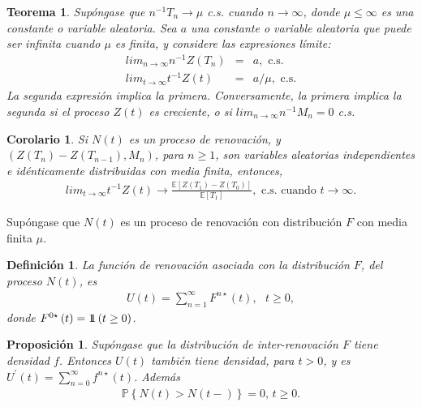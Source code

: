 \documentclass{article}
\newtheorem{Def}{Definición}
\newtheorem{Teo}{Teorema}
\newtheorem{Prop}{Proposición}
\newtheorem{Coro}{Corolario}
\newcommand{\esp}{\mathbb{E}}
\newcommand{\prob}{\mathbb{P}}
\newcommand{\indora}{\mbox{$1$\hspace{-0.8ex}$1$}}
\begin{document}
\begin{Teo}
Sup\'ongase que $n^{-1}T_{n}\rightarrow\mu$ c.s. cuando $n\rightarrow\infty$, donde $\mu\leq\infty$ es una constante o variable aleatoria. Sea $a$ una constante o variable aleatoria que puede ser infinita cuando $\mu$ es finita, y considere las expresiones l\'imite:
\begin{eqnarray}
lim_{n\rightarrow\infty}n^{-1}Z\left(T_{n}\right)&=&a,\textrm{ c.s.}\\
lim_{t\rightarrow\infty}t^{-1}Z\left(t\right)&=&a/\mu,\textrm{ c.s.}
\end{eqnarray}
La segunda expresi\'on implica la primera. Conversamente, la primera implica la segunda si el proceso $Z\left(t\right)$ es creciente, o si $lim_{n\rightarrow\infty}n^{-1}M_{n}=0$ c.s.
\end{Teo}

\begin{Coro}
Si $N\left(t\right)$ es un proceso de renovaci\'on, y $\left(Z\left(T_{n}\right)-Z\left(T_{n-1}\right),M_{n}\right)$, para $n\geq1$, son variables aleatorias independientes e id\'enticamente distribuidas con media finita, entonces,
\begin{eqnarray}
lim_{t\rightarrow\infty}t^{-1}Z\left(t\right)\rightarrow\frac{\esp\left[Z\left(T_{1}\right)-Z\left(T_{0}\right)\right]}{\esp\left[T_{1}\right]},\textrm{ c.s. cuando  }t\rightarrow\infty.
\end{eqnarray}
\end{Coro}


Sup\'ongase que $N\left(t\right)$ es un proceso de renovaci\'on con distribuci\'on $F$ con media finita $\mu$.

\begin{Def}
La funci\'on de renovaci\'on asociada con la distribuci\'on $F$, del proceso $N\left(t\right)$, es
\begin{eqnarray*}
U\left(t\right)=\sum_{n=1}^{\infty}F^{n\star}\left(t\right),\textrm{   }t\geq0,
\end{eqnarray*}
donde $F^{0\star}\left(t\right)=\indora\left(t\geq0\right)$.
\end{Def}


\begin{Prop}
Sup\'ongase que la distribuci\'on de inter-renovaci\'on $F$ tiene densidad $f$. Entonces $U\left(t\right)$ tambi\'en tiene densidad, para $t>0$, y es $U^{'}\left(t\right)=\sum_{n=0}^{\infty}f^{n\star}\left(t\right)$. Adem\'as
\begin{eqnarray*}
\prob\left\{N\left(t\right)>N\left(t-\right)\right\}=0\textrm{,   }t\geq0.
\end{eqnarray*}
\end{Prop}
\end{document}
